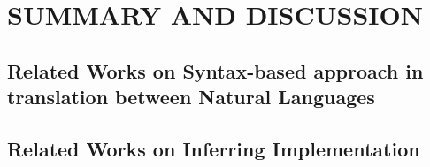 \chapter{SUMMARY AND DISCUSSION}
\section{Related Works on Syntax-based approach in translation between Natural Languages}
\section{Related Works on Inferring Implementation}

